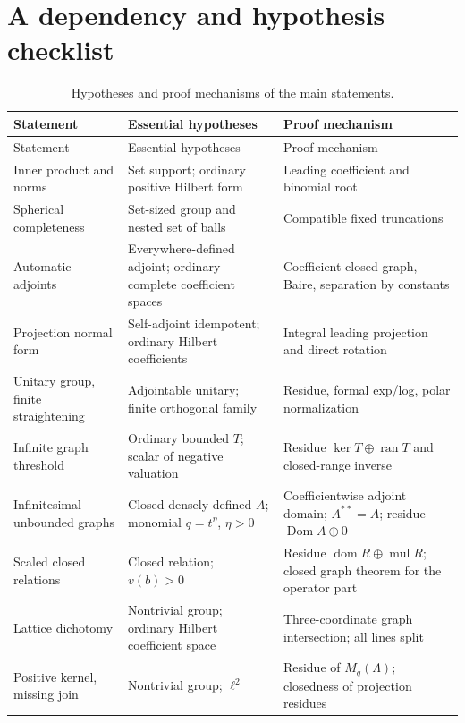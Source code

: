 \documentclass[11pt,letterpaper]{article}
\numberwithin{equation}{section}
\theoremstyle{definition}
\theoremstyle{remark}
\newcommand{\ran}{\operatorname{ran}}
\newcommand{\Dom}{\operatorname{Dom}}
\newcommand{\dom}{\operatorname{dom}}
\newcommand{\mul}{\operatorname{mul}}
\begin{document}
\section{A dependency and hypothesis checklist}\label{hgeo:app:checklist}

{\small
\begin{longtable}{@{}>{\raggedright\arraybackslash}p{}>{\raggedright\arraybackslash}p{}>{\raggedright\arraybackslash}p{}@{}}
\caption{Hypotheses and proof mechanisms of the main statements.}
\label{hgeo:tab:checklist}\\
\toprule
Statement & Essential hypotheses & Proof mechanism\\
\midrule
\endfirsthead
\toprule
Statement & Essential hypotheses & Proof mechanism\\
\midrule
\endhead
Inner product and norms & Set support; ordinary positive Hilbert form
 & Leading coefficient and binomial root\\[.4em]
Spherical completeness & Set-sized group and nested set of balls
 & Compatible fixed truncations\\[.4em]
Automatic adjoints & Everywhere-defined adjoint; ordinary complete
coefficient spaces & Coefficient closed graph, Baire, separation by
constants\\[.4em]
Projection normal form & Self-adjoint idempotent; ordinary Hilbert
coefficients & Integral leading projection and direct rotation\\[.4em]
Unitary group, finite straightening & Adjointable unitary; finite
orthogonal family & Residue, formal exp/log, polar normalization\\[.4em]
Infinite graph threshold & Ordinary bounded $T$; scalar of negative valuation
 & Residue $\ker T\oplus\ran T$ and closed-range inverse\\[.4em]
Infinitesimal unbounded graphs & Closed densely defined $A$; monomial
$q=t^\eta$, $\eta>0$ & Coefficientwise adjoint domain; $A^{**}=A$;
residue $\Dom A\oplus0$\\[.4em]
Scaled closed relations & Closed relation; $v(b)>0$ & Residue
$\dom R\oplus\mul R$; closed graph theorem for the operator part\\[.4em]
Lattice dichotomy & Nontrivial group; ordinary Hilbert coefficient space
 & Three-coordinate graph intersection; all lines split\\[.4em]
Positive kernel, missing join & Nontrivial group; $\ell^2$ & Residue of
$M_q(\Lambda)$; closedness of projection residues\\[.4em]

\end{longtable}}
\end{document}
